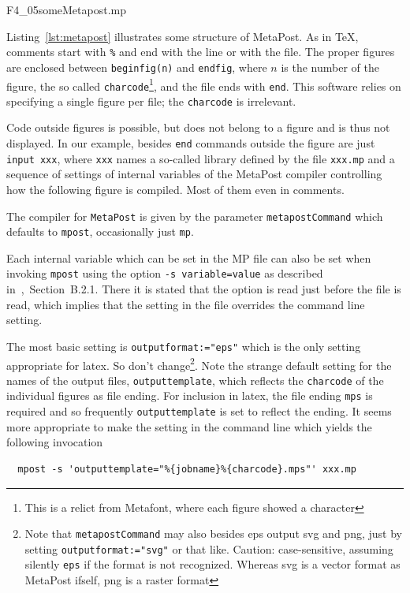 
{F4_05someMetapost.mp}

Listing~\ref{lst:metapost} illustrates some structure of MetaPost. 
As in \TeX, comments start with \texttt{\%} and end with the line or with the file. 
The proper figures are enclosed between \texttt{beginfig(n)} and \texttt{endfig}, %
where $n$ is the number of the figure, the so called \texttt{charcode}\footnote%
{This is a relict from Metafont, where each figure showed a character}, 
and the file ends with \texttt{end}. 
This software relies on specifying a single figure per file; the \texttt{charcode} is irrelevant. 

Code outside figures is possible, but does not belong to a figure 
and is thus not displayed. 
In our example, besides \texttt{end} commands outside the figure 
are just \texttt{input xxx}, where \texttt{xxx} names a so-called library 
defined by the file \texttt{xxx.mp} 
and a sequence of settings of internal variables 
of the MetaPost compiler 
controlling how the following figure is compiled. 
Most of them even in comments. 

The compiler for \texttt{MetaPost} 
is given by the parameter \texttt{metapostCommand} 
which defaults to \texttt{mpost}, occasionally just \texttt{mp}. 

Each internal variable which can be set in the MP file 
can also be set when invoking \texttt{mpost} 
using the option \texttt{-s \textlangle{}variable\textrangle=\textlangle{}value\textrangle} 
as described in~\cite{MPost},~Section~B.2.1. 
There it is stated that the option is read just before the file is read, 
which implies that the setting in the file overrides the command line setting. 

The most basic setting is \texttt{outputformat:="eps"} %
which is the only setting appropriate for latex. 
So don't change\footnote%
{Note that \texttt{metapostCommand} may also besides \gls{eps} 
output \gls{svg} and \gls{png}, 
just by setting \texttt{outputformat:="svg"} or that like. %
Caution: case-sensitive, assuming silently \texttt{eps} if the format is not recognized. 
Whereas \gls{svg} is a vector format as MetaPost ifself, \gls{png} is a raster format}. 
Note the strange default setting for the names of the output files, \texttt{outputtemplate}, 
which reflects the \texttt{charcode} of the individual figures as file ending. 
For inclusion in latex, the file ending \texttt{mps} is required 
and so frequently \texttt{outputtemplate} is set to reflect the ending. 
It seems more appropriate to make the setting in the command line 
which yields the following invocation
%
\begin{verbatim}
  mpost -s 'outputtemplate="%{jobname}%{charcode}.mps"' xxx.mp
\end{verbatim}

